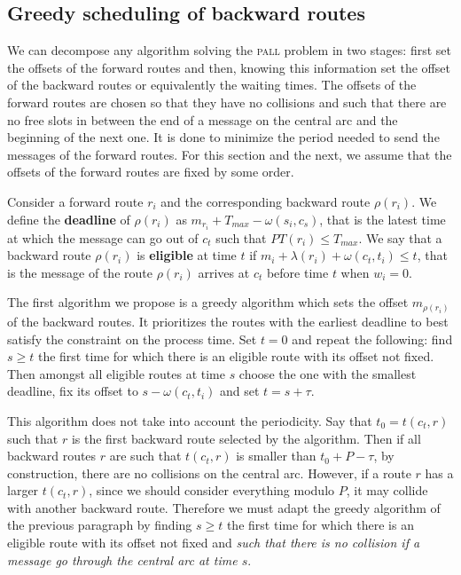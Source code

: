 \documentclass[10pt, conference, letterpaper]{IEEEtran}
\newcommand\pall{\textsc{pall}\xspace}
\begin{document}
   \subsection{Greedy scheduling of backward routes}
    
    We can decompose any algorithm solving the \pall problem in two stages: first set the offsets of the forward routes and then, knowing this information set the offset of the backward routes or equivalently the waiting times.  
    The offsets of the forward routes are chosen so that they have no collisions and such that there are no free slots in between the end of a message on the central arc and the beginning of the next one. 
    It is done to minimize the period needed to send the messages of the forward routes. For this section and the next, we assume that the offsets of the forward routes are fixed by some order. 
    
    Consider a forward route $r_i$ and the corresponding backward route $\rho(r_i)$.
    We define the {\bf deadline} of $\rho(r_i)$ as $m_{r_i} + T_{max} - \omega(s_i,c_s)$, that is the latest time at which the message can go out of $c_t$ such that $PT(r_i) \leq T_{max}$.
    We say that a backward route $\rho(r_i)$ is {\bf eligible} at time $t$ if $m_{i} +  \lambda(r_i) + \omega(c_t,t_i) \leq t$, that is the message of the route $\rho(r_i)$ arrives at $c_t$ before time $t$ when $w_i = 0$.
    
    The first algorithm we propose is a greedy algorithm which sets the offset $m_{\rho(r_i)}$ of the 
    backward routes. It prioritizes the routes with the earliest deadline to best satisfy the
    constraint on the process time. Set $t=0$ and repeat the following: find $s \geq t$ the first time for which there is an eligible route with its offset not fixed. Then amongst all eligible routes at time $s$ choose the one with the smallest deadline, fix its offset to $s - \omega(c_t,t_i) $ and set $t = s + \tau$.
    
    This algorithm does not take into account the periodicity. Say that $t_0 = t(c_t,r)$ such that $r$ is the first backward route selected by the algorithm. Then if all backward routes $r$ are such that $t(c_t,r)$ is smaller than $t_0 + P - \tau$,
    by construction, there are no collisions on the central arc.
    However, if a route $r$ has a larger $t(c_t,r)$, since we should consider everything modulo $P$, 
    it may collide with another backward route. Therefore we must adapt the greedy algorithm of the previous paragraph by finding $s \geq t$ the first time for which there is an eligible route with its offset not fixed and \emph{such that there is no collision if a message go through the central arc at time $s$}. 
    
\end{document}
